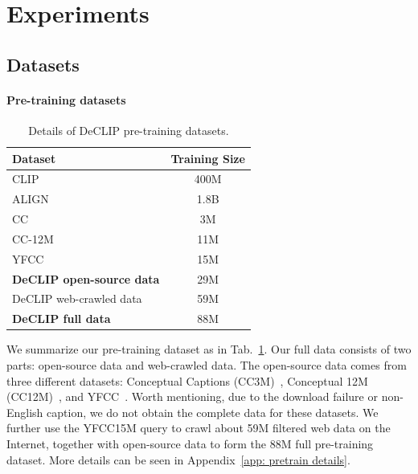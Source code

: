 

\section{Experiments}

\subsection{Datasets}
\paragraph{Pre-training datasets}
\begin{table}
\vspace{-1.2em}
\caption{\label{tab:pretrain datasets} Details of DeCLIP pre-training datasets.}
\label{tab:dataset}
\centering
\scriptsize
\begin{sc}
\begin{tabular}{lc}
   \toprule  
   \textbf{Dataset}        & \textbf{Training Size} \\
   \midrule 
      CLIP~\citep{radford2021learning}  & 400M \\
      ALIGN~\citep{jia2021scaling} & 1.8B \\
   \midrule   
   CC~\citep{sharma2018conceptual} & 3M	   \\
   CC-12M~\citep{changpinyo2021conceptual}   & 11M      \\
   YFCC~\citep{thomee2016yfcc100m}      & 15M	 \\
   \textbf{DeCLIP open-source data}  & 29M     \\ 
    \midrule 
   DeCLIP web-crawled data                & 59M      \\ 
   \textbf{DeCLIP full data}          & 88M         \\ 

   \bottomrule
\end{tabular}
\end{sc}
\end{table} 
We summarize our pre-training dataset as in Tab.~\ref{tab:dataset}. 
Our \workname full data consists of two parts: open-source data and web-crawled data. The open-source data comes from three different datasets: Conceptual Captions (CC3M)~\citep{sharma2018conceptual}, Conceptual 12M (CC12M)~\citep{changpinyo2021conceptual}, and YFCC~\citep{thomee2016yfcc100m}. Worth mentioning, due to the download failure or non-English caption, we do not obtain the complete data for these datasets.
We further use the YFCC15M query to crawl about 59M filtered web data on the Internet, together with open-source data to form the 88M \workname full pre-training dataset. More details can be seen in Appendix~\ref{app: pretrain details}.




